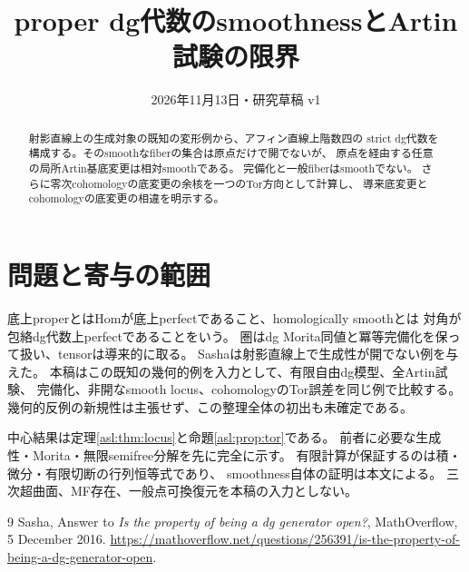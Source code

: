 
\title{proper dg代数のsmoothnessとArtin試験の限界}
\author{}
\date{2026年11月13日・研究草稿 v1}

\maketitle
\begin{abstract}
射影直線上の生成対象の既知の変形例から、アフィン直線上階数四の
strict dg代数を構成する。そのsmoothなfiberの集合は原点だけで開でないが、
原点を経由する任意の局所Artin基底変更は相対smoothである。
完備化と一般fiberはsmoothでない。
さらに零次cohomologyの底変更の余核を一つのTor方向として計算し、
導来底変更とcohomologyの底変更の相違を明示する。
\end{abstract}
\section*{問題と寄与の範囲}
底上properとはHomが底上perfectであること、homologically smoothとは
対角が包絡dg代数上perfectであることをいう。
圏はdg Morita同値と冪等完備化を保って扱い、tensorは導来的に取る。
Sasha\cite{AMSasha}は射影直線上で生成性が開でない例を与えた。
本稿はこの既知の幾何的例を入力として、有限自由dg模型、全Artin試験、
完備化、非開なsmooth locus、cohomologyのTor誤差を同じ例で比較する。
幾何的反例の新規性は主張せず、この整理全体の初出も未確定である。

中心結果は定理\ref{asl:thm:locus}と命題\ref{asl:prop:tor}である。
前者に必要な生成性・Morita・無限semifree分解を先に完全に示す。
有限計算が保証するのは積・微分・有限切断の行列恒等式であり、
smoothness自体の証明は本文による。
三次超曲面、MF存在、一般点可換復元を本稿の入力としない。


\begin{thebibliography}{9}
 Sasha,
Answer to \emph{Is the property of being a dg generator open?},
MathOverflow, 5 December 2016.
\url{https://mathoverflow.net/questions/256391/is-the-property-of-being-a-dg-generator-open}.
\end{thebibliography}

